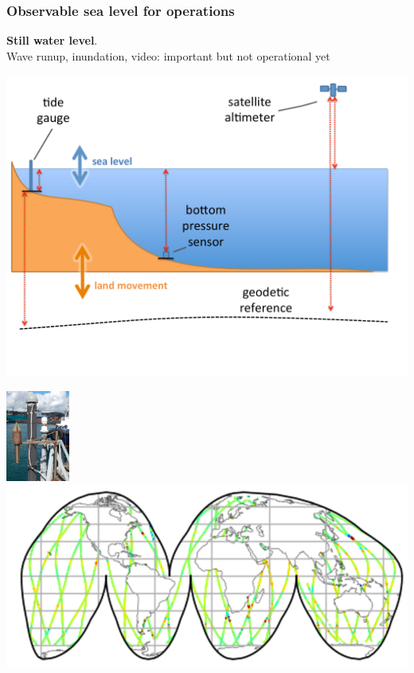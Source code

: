 \begin{frame}
\frametitle{Observable sea level for operations}
\textbf{Still water level}.\\
Wave runup, inundation, video: important but not operational yet
\begin{minipage}{0.6\textwidth}
    \includegraphics[width=\textwidth]{figures/diagrams/sealevel_cartoon.pdf}
\end{minipage}
\begin{minipage}{0.35\textwidth}
    \includegraphics[height=3cm]{figures/images/tidegaugeEg.png}
    \vspace{1cm}
    \includegraphics[width=\textwidth]{figures/maps/altimeterCoverageEg.png}
\end{minipage}
\end{frame}
